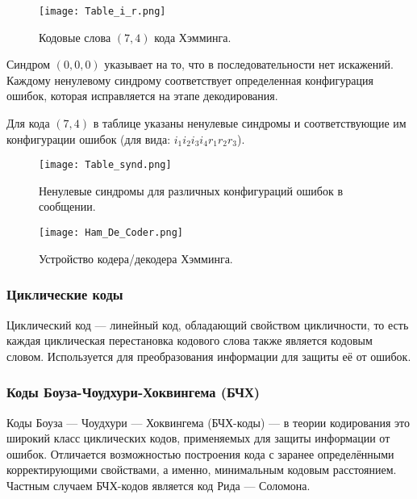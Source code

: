 \begin{figure}[H]
	\begin{center}
		\texttt{[image: Table\_i\_r.png]}
		\caption{Кодовые слова $(7,4)$ кода Хэмминга.} %
		\label{Table_i_r} %
	\end{center}
\end{figure}

Синдром $(0,0,0)$ указывает на то, что в последовательности нет искажений. Каждому ненулевому синдрому соответствует определенная конфигурация ошибок, которая исправляется на этапе декодирования.

Для кода $(7,4)$ в таблице указаны ненулевые синдромы и соответствующие им конфигурации ошибок (для вида: $i_1  i_2  i_3  i_4 r_1 r_2 r_3$).

\begin{figure}[H]
	\begin{center}
		\texttt{[image: Table\_synd.png]}
		\caption{Ненулевые синдромы для различных конфигураций ошибок в сообщении.} %
		\label{Table_synd} %
	\end{center}
\end{figure}

\begin{figure}[H]
	\begin{center}
		\texttt{[image: Ham\_De\_Coder.png]}
		\caption{Устройство кодера/декодера Хэмминга.} %
		\label{Ham_De_Coder} %
	\end{center}
\end{figure}



\subsubsection{Циклические коды}
Циклический код — линейный код, обладающий свойством цикличности, то есть каждая циклическая перестановка кодового слова также является кодовым словом. Используется для преобразования информации для защиты её от ошибок.

\subsubsection{Коды Боуза-Чоудхури-Хоквингема (БЧХ)}
Коды Боуза — Чоудхури — Хоквингема (БЧХ-коды) — в теории кодирования это широкий класс циклических кодов, применяемых для защиты информации от ошибок. Отличается возможностью построения кода с заранее определёнными корректирующими свойствами, а именно, минимальным кодовым расстоянием. Частным случаем БЧХ-кодов является код Рида — Соломона.

